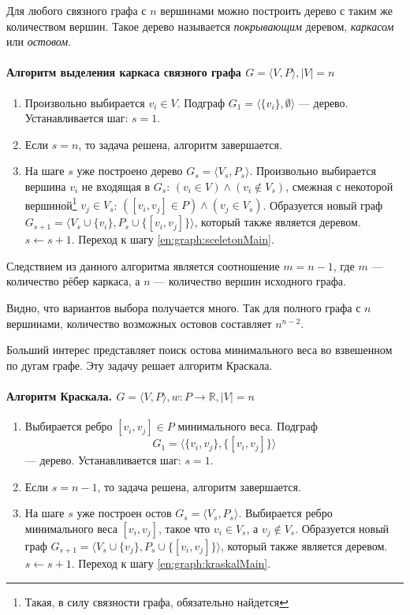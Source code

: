 Для любого связного графа с $n$ вершинами можно построить дерево с таким же количеством вершин. Такое дерево называется \emph{покрывающим} деревом, \emph{каркасом} или \emph{остовом}.


\paragraph{Алгоритм выделения каркаса связного графа $G=\langle V,P\rangle,|V|=n$}
\begin{enumerate}
    \item Произвольно выбирается $v_i\in V$. Подграф $G_1=\langle \{v_i\},\emptyset\rangle$ --- дерево. Устанавливается шаг: $s=1$.
    
    \item\label{en:graph:sceletonMain} Если $s=n$, то задача решена, алгоритм завершается.
    
    \item На шаге $s$ уже построено дерево $G_s=\langle V_s,P_s\rangle$. Произвольно выбирается вершина $v_i$ не входящая в $G_s$: $(v_i\in V)\land (v_i\not\in V_s)$, смежная с некоторой вершиной\footnote{Такая, в силу связности графа, обязательно найдется} $v_j\in V_s$: $([v_i,v_j]\in P)\land(v_j\in V_s)$. Образуется новый граф $G_{s+1}=\langle V_s\cup\{v_i\},P_s\cup\{[v_i,v_j]\}\rangle$, который также является деревом. $s\gets s+1$. Переход к шагу \ref{en:graph:sceletonMain}.
\end{enumerate}

Следствием из данного алгоритма является соотношение $m=n-1$, где $m$ --- количество рёбер каркаса, а $n$ --- количество вершин исходного графа.

Видно, что вариантов выбора получается много. Так для полного графа с $n$ вершинами, количество возможных остовов составляет $n^{n-2}$.

Больший интерес представляет поиск остова минимального веса во взвешенном по дугам графе. Эту задачу решает алгоритм Краскала.
\paragraph{Алгоритм Краскала. $G=\langle V,P\rangle,w:P\to\mathbb{R},|V|=n$}
\begin{enumerate}
    \item Выбирается ребро $[v_i,v_j]\in P$ минимального веса. Подграф 
    \[
        G_1=\langle \{v_i, v_j\}, \{[v_i, v_j]\}\rangle
    \] 
    --- дерево. Устанавливается шаг: $s=1$.
    
    \item\label{en:graph:kraskalMain} Если $s=n-1$, то задача решена, алгоритм завершается.
    
    \item На шаге $s$ уже построен остов $G_s=\langle V_s,P_s\rangle$. Выбирается ребро минимального веса $[v_i,v_j]$, такое что $v_i\in V_s$, а $v_j\not\in V_s$. Образуется новый граф $G_{s+1}=\langle V_s\cup\{v_j\},P_s\cup\{[v_i,v_j]\}\rangle$, который также является деревом. $s\gets s+1$. Переход к шагу \ref{en:graph:kraskalMain}.
\end{enumerate}



